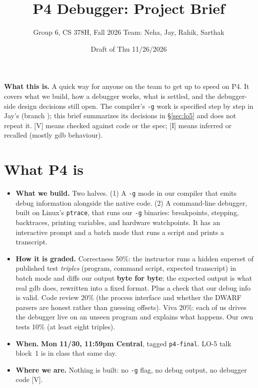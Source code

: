 \documentclass[10pt]{article}
\title{\vspace{-1.2em}\textbf{P4 Debugger: Project Brief}\vspace{-0.4em}}
\author{Group 6, CS 378H, Fall 2026 \quad\textbullet\quad Team: Neha, Jay, Rahik, Sarthak}
\date{Draft of Thu 11/26/2026}
\newcommand{\code}[1]{\texttt{\small #1}}
\newcommand{\mV}{\textsf{\scriptsize[V]}}
\newcommand{\mI}{\textsf{\scriptsize[I]}}
\begin{document}
\maketitle
\vspace{-1em}

\textbf{What this is.} A quick way for anyone on the team to get up to speed on P4. It covers what we build, how a debugger works, what is settled, and the debugger-side design decisions still open. The compiler's \code{-g} work is specified step by step in Jay's  (branch ); this brief summarizes its decisions in \S\ref{sec:lo5} and does not repeat it. \mV{} means checked against code or the spec; \mI{} means inferred or recalled (mostly gdb behaviour).

\section{What P4 is}\label{sec:what}

\begin{itemize}
\item \textbf{What we build.} Two halves. (1) A \code{-g} mode in our compiler that emits debug information alongside the native code. (2) A command-line debugger, built on Linux's \code{ptrace}, that runs our \code{-g} binaries: breakpoints, stepping, backtraces, printing variables, and hardware watchpoints. It has an interactive prompt and a batch mode that runs a script and prints a transcript.
\item \textbf{How it is graded.} Correctness 50\%: the instructor runs a hidden superset of published test \emph{triples} (program, command script, expected transcript) in batch mode and diffs our output \textbf{byte for byte}; the expected output is what real gdb does, rewritten into a fixed format. Plus a check that our debug info is valid. Code review 20\% (the process interface and whether the DWARF parsers are honest rather than guessing offsets). Viva 20\%: each of us drives the debugger live on an unseen program and explains what happens. Our own tests 10\% (at least eight triples).
\item \textbf{When.} \textbf{Mon 11/30, 11:59pm Central}, tagged \code{p4-final}. LO-5 talk block~1 is in class that same day.
\item \textbf{Where we are.} Nothing is built: no \code{-g} flag, no debug output, no debugger code \mV.
\end{itemize}
\end{document}
